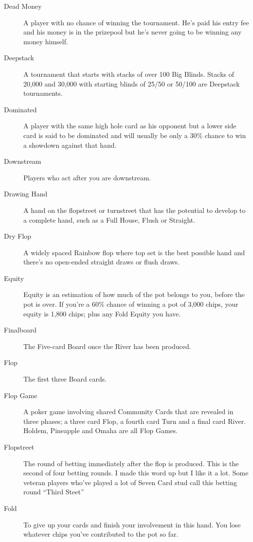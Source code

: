 \begin{description}
\item[Dead Money] A player with no chance of winning the tournament.
He's paid his entry fee and his money is in the prizepool but he's
never going to be winning any money himself.

\item[Deepstack] A tournament that starts with stacks of over 100 Big
Blinds. Stacks of 20,000 and 30,000 with starting blinds of 25/50 or
50/100 are Deepstack tournaments.

\item[Dominated] A player with the same high hole card as his opponent
but a lower side card is said to be dominated and will usually be
only a 30\% chance to win a showdown against that hand.

\item[Downstream] Players who act after you are downstream.

\item[Drawing Hand] A hand on the flopstreet or turnstreet that has
the potential to develop to a complete hand, such as a Full House,
Flush or Straight.

\item[Dry Flop] A widely spaced Rainbow flop where top set is the best
possible hand and there's no open-ended straight draws or flush
draws.

\item[Equity] Equity is an estimation of how much of the pot belongs
to you, before the pot is over. If you're a 60\% chance of winning a
pot of 3,000 chips, your equity is 1,800 chips; plus any Fold Equity
you have.

\item[Finalboard] The Five-card Board once the River has been
produced.

\item[Flop] The first three Board cards.

\item[Flop Game] A poker game involving shared Community Cards that
are revealed in three phases; a three card Flop, a fourth card Turn
and a final card River. Holdem, Pineapple and Omaha are all Flop
Games.

\item[Flopstreet] The round of betting immediately after the flop is
produced. This is the second of four betting rounds. I made this word
up but I like it a lot. Some veteran players who've played a lot of
Seven Card stud call this betting round ``Third Steet''

\item[Fold] To give up your cards and finish your involvement in this
hand. You lose whatever chips you've contributed to the pot so far.


\end{description}
